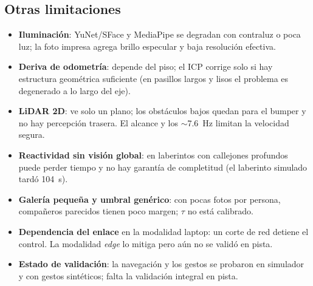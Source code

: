 \documentclass[11pt,a4paper]{article}
\begin{document}
\subsection{Otras limitaciones}
\begin{itemize}
\item \textbf{Iluminaci\'on}: YuNet/SFace y MediaPipe se degradan con contraluz o poca luz; la foto impresa agrega brillo especular y baja resoluci\'on efectiva.
\item \textbf{Deriva de odometr\'ia}: depende del piso; el ICP corrige solo si hay estructura geom\'etrica suficiente (en pasillos largos y lisos el problema es degenerado a lo largo del eje).
\item \textbf{LiDAR 2D}: ve solo un plano; los obst\'aculos bajos quedan para el bumper y no hay percepci\'on trasera. El alcance y los $\sim$7.6~Hz limitan la velocidad segura.
\item \textbf{Reactividad sin visi\'on global}: en laberintos con callejones profundos puede perder tiempo y no hay garant\'ia de completitud (el laberinto simulado tard\'o 104~s).
\item \textbf{Galer\'ia peque\~na y umbral gen\'erico}: con pocas fotos por persona, compa\~neros parecidos tienen poco margen; $\tau$ no est\'a calibrado.
\item \textbf{Dependencia del enlace} en la modalidad laptop: un corte de red detiene el control. La modalidad \emph{edge} lo mitiga pero a\'un no se valid\'o en pista.
\item \textbf{Estado de validaci\'on}: la navegaci\'on y los gestos se probaron en simulador y con gestos sint\'eticos; falta la validaci\'on integral en pista.
\end{itemize}
\end{document}
